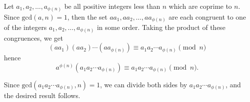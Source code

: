 \documentclass[12pt]{article}
\begin{document}
Let $a_1, a_2, \ldots , a_{\phi (n)}$ be all positive integers less than $n$ which are coprime to $n$. Since $\text{gcd}(a,n)=1$, then the set $aa_1, aa_2,\ldots ,aa_{\phi (n)}$ are each congruent to one of the integers $a_1, a_2, \ldots ,a_{\phi (n)}$ in some order. Taking the product of these congruences, we get
\[ (aa_1)(aa_2) \cdots (aa_{\phi (n)}) \equiv a_1 a_2 \cdots a_{\phi (n)} \pmod{n} \]
hence
\[ a^{\phi (n)}(a_1 a_2 \cdots a_{\phi (n)}) \equiv a_1 a_2 \cdots a_{\phi (n)} \pmod{n}. \]

Since $\text{gcd}(a_1a_2\cdots a_{\phi (n)},n) = 1$, we can divide both sides by $a_1a_2\cdots a_{\phi (n)}$, and the desired result follows.
\end{document}
